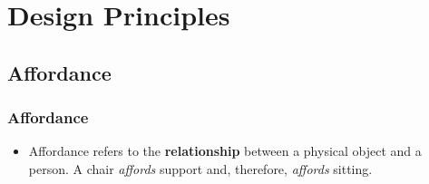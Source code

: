 \documentclass{beamer}
\begin{document}



\section{Design Principles}

\subsection{Affordance}

\begin{frame}
\frametitle{Affordance}
\begin{itemize}
	\item Affordance refers to the \textbf{relationship} between a physical object and a person.  A chair \textit{affords} support and, therefore, \textit{affords} sitting.  
\end{itemize}
\end{frame}
\end{document}
